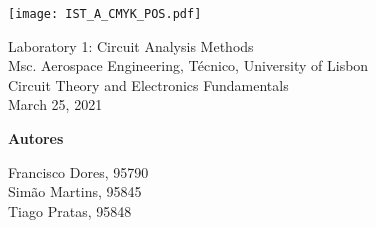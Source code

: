 \thispagestyle {empty}

\begin{titlepage}
\texttt{[image: IST\_A\_CMYK\_POS.pdf]}

\begin{center}
%
\vspace{1.0cm}

\vspace{5cm}
{\FontLb Laboratory 1: Circuit Analysis Methods} \\ %
\vspace{1cm}
{\FontSn Msc. Aerospace Engineering, Técnico, University of Lisbon} \\
\vspace{1cm}
{\FontSn Circuit Theory and Electronics Fundamentals} \\
\vspace{1cm}
{\FontSn March 25, 2021} \\


\vspace{8cm}


\textbf{{Autores}\\[0.06in]}

Francisco Dores, 95790\\
Simão Martins, 95845\\
Tiago Pratas, 95848\\ 
\vspace{2cm}

\end{center}

\end{titlepage}

